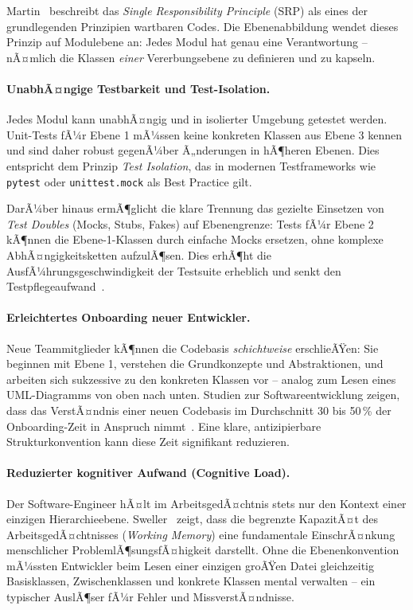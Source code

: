 ﻿\documentclass[a4paper,12pt]{article}
\begin{document}
Martin~\cite{martin2017} beschreibt das \textit{Single Responsibility Principle}
(SRP) als eines der grundlegenden Prinzipien wartbaren Codes. Die Ebenenabbildung
wendet dieses Prinzip auf Modulebene an: Jedes Modul hat genau eine Verantwortung
-- nÃ¤mlich die Klassen \textit{einer} Vererbungsebene zu definieren und zu
kapseln.

\paragraph{UnabhÃ¤ngige Testbarkeit und Test-Isolation.}
Jedes Modul kann unabhÃ¤ngig und in isolierter Umgebung getestet werden. Unit-Tests
fÃ¼r Ebene 1 mÃ¼ssen keine konkreten Klassen aus Ebene 3 kennen und sind daher
robust gegenÃ¼ber Ã„nderungen in hÃ¶heren Ebenen. Dies entspricht dem Prinzip
\textit{Test Isolation}, das in modernen Testframeworks wie \texttt{pytest}
\cite{pytest2024} oder \texttt{unittest.mock} als Best Practice gilt.

DarÃ¼ber hinaus ermÃ¶glicht die klare Trennung das gezielte Einsetzen von
\textit{Test Doubles} (Mocks, Stubs, Fakes) auf Ebenengrenze: Tests fÃ¼r Ebene 2
kÃ¶nnen die Ebene-1-Klassen durch einfache Mocks ersetzen, ohne komplexe
AbhÃ¤ngigkeitsketten aufzulÃ¶sen. Dies erhÃ¶ht die AusfÃ¼hrungsgeschwindigkeit der
Testsuite erheblich und senkt den Testpflegeaufwand~\cite{meszaros2007}.

\paragraph{Erleichtertes Onboarding neuer Entwickler.}
Neue Teammitglieder kÃ¶nnen die Codebasis \textit{schichtweise} erschlieÃŸen: Sie
beginnen mit Ebene 1, verstehen die Grundkonzepte und Abstraktionen, und arbeiten
sich sukzessive zu den konkreten Klassen vor -- analog zum Lesen eines
UML-Diagramms von oben nach unten. Studien zur Softwareentwicklung zeigen, dass
das VerstÃ¤ndnis einer neuen Codebasis im Durchschnitt 30 bis 50\,\% der
Onboarding-Zeit in Anspruch nimmt~\cite{robillard2011}. Eine klare, antizipierbare
Strukturkonvention kann diese Zeit signifikant reduzieren.

\paragraph{Reduzierter kognitiver Aufwand (Cognitive Load).}
Der Software-Engineer hÃ¤lt im ArbeitsgedÃ¤chtnis stets nur den Kontext einer
einzigen Hierarchieebene. Sweller~\cite{sweller1988} zeigt, dass die begrenzte
KapazitÃ¤t des ArbeitsgedÃ¤chtnisses (\textit{Working Memory}) eine fundamentale
EinschrÃ¤nkung menschlicher ProblemlÃ¶sungsfÃ¤higkeit darstellt. Ohne die
Ebenenkonvention mÃ¼ssten Entwickler beim Lesen einer einzigen groÃŸen Datei
gleichzeitig Basisklassen, Zwischenklassen und konkrete Klassen mental verwalten
-- ein typischer AuslÃ¶ser fÃ¼r Fehler und MissverstÃ¤ndnisse.
\end{document}

